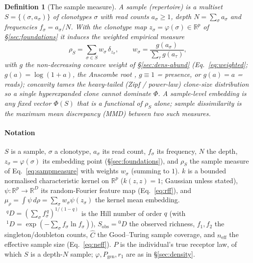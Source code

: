 \documentclass[11pt]{article}
\theoremstyle{oldplain}
\theoremstyle{oldrem}
\newtheorem{definition}{Definition}
\newcommand{\Pgen}{P_{\mathrm{gen}}}
\newcommand{\R}{\mathds{R}}  %
\begin{document}
\begin{definition}[The sample measure]\label{def:sampmeasure}
A sample (repertoire) is a multiset $S=\{(\sigma,a_\sigma)\}$ of clonotypes $\sigma$ with read counts
$a_\sigma\ge1$, depth $N=\sum_\sigma a_\sigma$ and frequencies $f_\sigma=a_\sigma/N$. With the clonotype map
$z_\sigma=\varphi(\sigma)\in\R^{p}$ of \S\ref{sec:foundations} it induces the weighted empirical measure
\begin{equation}\label{eq:sampmeasure}
  \rho_S=\sum_{\sigma\in S} w_\sigma\,\delta_{z_\sigma},\qquad
  w_\sigma=\frac{g(a_\sigma)}{\sum_{\tau} g(a_\tau)},
\end{equation}
with $g$ the non-decreasing concave weight of \S\ref{sec:dens-abund} (Eq.~\eqref{eq:weighted};
$g(a)=\log(1+a)$, the Anscombe root \cite{Anscombe1948}, $g\equiv1$ = presence, or $g(a)=a$ = reads);
concavity tames the heavy-tailed (Zipf / power-law) clone-size distribution \cite{Desponds2016,Koch2018} so a
single hyperexpanded clone cannot dominate $\Phi$. A \emph{sample-level embedding} is any fixed vector
$\Phi(S)$ that is a functional of $\rho_S$ alone; sample dissimilarity is the maximum mean discrepancy
({\scshape MMD}) between two such measures.
\end{definition}

\paragraph{Notation} $S$ is a sample, $\sigma$ a clonotype, $a_\sigma$ its read count, $f_\sigma$ its frequency,
$N$ the depth, $z_\sigma=\varphi(\sigma)$ its embedding point (\S\ref{sec:foundations}), and $\rho_S$ the sample
measure of Eq.~\eqref{eq:sampmeasure} with weights $w_\sigma$ (summing to $1$). $k$ is a bounded normalised
characteristic kernel on $\R^{p}$ ($k(z,z)=1$; Gaussian unless stated), $\psi:\R^{p}\to\R^{D}$ its
random-Fourier feature map (Eq.~\eqref{eq:rff}), and $\mu_\rho=\int\psi\,d\rho=\sum_\sigma w_\sigma\psi(z_\sigma)$
the kernel mean embedding. $\;^qD=(\sum_\sigma f_\sigma^{\,q})^{1/(1-q)}$ is the Hill number of order $q$ (with
$\;^1D=\exp(-\sum_\sigma f_\sigma\ln f_\sigma)$), $S_{\mathrm{obs}}={}^0D$ the observed richness, $f_1,f_2$ the
singleton/doubleton counts, $\hat C$ the Good--Turing sample coverage, and $n_{\mathrm{eff}}$ the effective
sample size (Eq.~\eqref{eq:neff}). $P$ is the individual's true receptor law, of which $S$ is a depth-$N$
sample; $\varphi,\Pgen,r_1$ are as in \S\ref{sec:density}.
\end{document}
